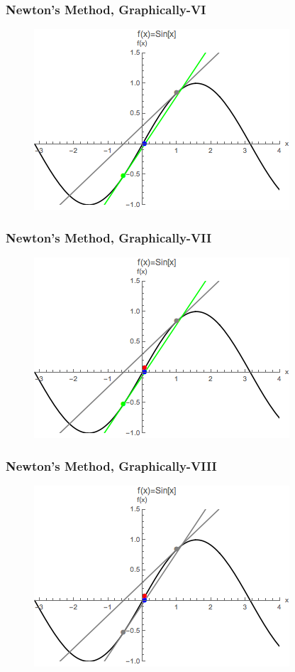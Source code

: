 \documentclass{beamer}
\begin{document}
\begin{frame}
\frametitle[alignment=center]{Newton's Method, Graphically-VI}
\begin{figure}[htdb!]
\centering
\includegraphics[scale=0.8]{Newton_6.png}
\end{figure}
\end{frame}

\begin{frame}
\frametitle[alignment=center]{Newton's Method, Graphically-VII}
\begin{figure}[htdb!]
\centering
\includegraphics[scale=0.8]{Newton_7.png}
\end{figure}
\end{frame}

\begin{frame}
\frametitle[alignment=center]{Newton's Method, Graphically-VIII}
\begin{figure}[htdb!]
\centering
\includegraphics[scale=0.8]{Newton_8.png}
\end{figure}
\end{frame}
\end{document}
